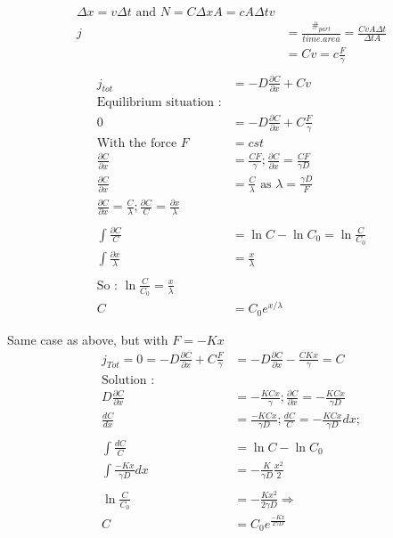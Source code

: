 \documentclass[10pt,a4paper]{article}
\begin{document}
\begin{align*}
    \Delta x = v\Delta t \text{ and } N = C\Delta x A = cA\Delta t v\\
    j &= \frac{\#_{part}}{time.area} = \frac{CvA\Delta t}{\Delta t A}\\
    &= Cv = c\frac{F}{\gamma}\\
\end{align*}
\begin{align*}
    j_{tot} &= -D \frac{\partial C}{\partial x} + Cv\\
    \text{Equilibrium situation :}\\
    0 &= -D\frac{\partial C}{\partial x} + C\frac{F}{\gamma}\\
    \text{With the force } F&=cst\\
    \frac{\partial C}{\partial x} &= \frac{CF}{\gamma} ; \frac{\partial C}{\partial x} = \frac{CF}{\gamma D}\\
    \frac{\partial C}{\partial x} &= \frac{C}{\lambda} \text{ as } \lambda = \frac{\gamma D}{F} \\
    \frac{\partial C}{\partial x} = \frac{C}{\lambda} ; \frac{\partial C}{C} = \frac{\partial x}{\lambda}\\
    ~~~\\
    \int \frac{\partial C}{C} &= \ln C - \ln C_0 = \ln \frac{C}{C_0}\\
    \int \frac{\partial x}{\lambda} &= \frac{x}{\lambda} \\
    ~~~\\
    \text{So : } \ln\frac{C}{C_0} = \frac{x}{\lambda}\\
    C &= C_0 e^{x/\lambda}
\end{align*}

Same case as above, but with $F = -Kx$\\
\begin{align*}
    j_{Tot} = 0 = -D\frac{\partial C}{\partial x} + C\frac{F}{\gamma} &= -D\frac{\partial C}{\partial x} - \frac{CKx}{\gamma} = C\\
    \text{Solution :}\\
    D\frac{\partial C}{\partial x} &= -\frac{KCx}{\gamma}; \frac{\partial C}{\partial x} = -\frac{KCx}{\gamma D}\\
    \frac{dC}{dx} &= \frac{-KCx}{\gamma D} ; \frac{dC}{C} = -\frac{KCx}{\gamma D}dx;\\
    ~~~~~\\
    \int \frac{dC}{C} &= \ln C - \ln C_0\\
    \int \frac{-Kx}{\gamma D}dx &= -\frac{K}{\gamma D}\frac{x^2}{2}\\
    ~~~~~\\
    \ln \frac{C}{C_0} &= -\frac{Kx^2}{2\gamma D} \Rightarrow \\
    C &= C_0 e^{\frac{-Kx}{2\gamma D}}
\end{align*}
\end{document}
